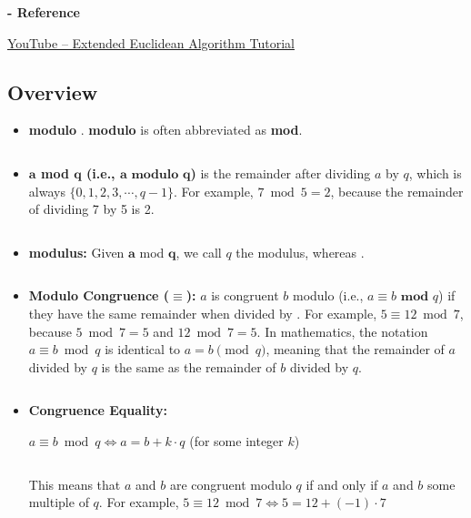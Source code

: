 
\noindent \textbf{- Reference} 

\href{https://www.youtube.com/watch?v=fz1vxq5ts5I}{YouTube -- Extended Euclidean Algorithm Tutorial}


\subsection{Overview}

\begin{tcolorbox}[title={\textbf{\tboxdef{\ref*{subsec:group-def}} Integer Modulo}}]

\begin{itemize}

\item \textbf{modulo} . \textbf{modulo} is often abbreviated as \textbf{mod}.

$ $

\item \textbf{$\bm{a}$ mod $\bm{q}$ (i.e., $\bm{a} \bm{\text{ modulo } q}$)} is the remainder after dividing $a$ by $q$, which is always  $\{0, 1, 2, 3, \cdots, q-1\}$. For example, $7 \bmod 5 = 2$, because the remainder of dividing 7 by 5 is 2. 

$ $

\item \textbf{modulus:} Given $\bm{a}$ mod $\bm{q}$, we call  $q$ the modulus, whereas .

$ $

\item \textbf{Modulo Congruence ($\bm{\equiv}$):} $a$ is congruent  $b$ modulo  (i.e., $a \equiv b \textbf{ mod } q$) if they have the same remainder when divided by . For example, $5 \equiv 12 \bmod 7$, because $5 \bmod 7 = 5$ and $12 \bmod 7 = 5$. In mathematics, the notation $a \equiv b \bmod q$ is identical to $a = b \pmod q$, meaning that the remainder of $a$ divided by $q$ is the same as the remainder of $b$ divided by $q$. 

$ $

\item \textbf{Congruence \textit{} Equality:} 

$a \equiv b \bmod q \Longleftrightarrow a = b + k\cdot q$ \text{ } (for some integer $k$)

$ $

This means that $a$ and $b$ are congruent modulo $q$ if and only if $a$ and $b$  some multiple of $q$. For example, $5 \equiv 12 \bmod 7 \Longleftrightarrow 5 = 12 + (-1)\cdot 7$

\end{itemize}

\end{tcolorbox}


